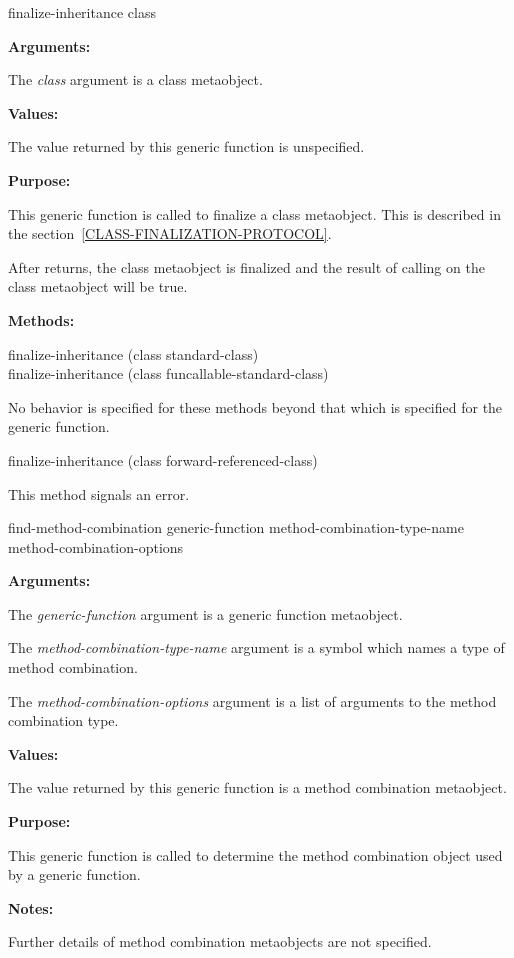 \begin{defun}
finalize-inheritance class

\textbf{Arguments:}

The \emph{class} argument is a class metaobject.

\textbf{Values:}

The value returned by this generic function is unspecified.

\textbf{Purpose:}

This generic function is called to finalize a class metaobject. This is
described in the section~\ref{CLASS-FINALIZATION-PROTOCOL}.

After  returns, the class metaobject is finalized and the
result of calling  on the class metaobject will be true.

\textbf{Methods:}

\begin{defun}
finalize-inheritance (class standard-class) \\
finalize-inheritance (class funcallable-standard-class)

No behavior is specified for these methods beyond that which is specified for the generic function.
\end{defun}

\begin{defun}
finalize-inheritance (class forward-referenced-class)

This method signals an error.
\end{defun}
\end{defun}

\begin{defun}
find-method-combination generic-function method-combination-type-name method-combination-options

\textbf{Arguments:}

The \emph{generic-function} argument is a generic function metaobject.

The \emph{method-combination-type-name} argument is a symbol which names a type
of method combination.

The \emph{method-combination-options} argument is a list of arguments to the
method combination type.

\textbf{Values:}

The value returned by this generic function is a method combination metaobject.

\textbf{Purpose:}

This generic function is called to determine the method combination object used
by a generic function.

\textbf{Notes:}

Further details of method combination metaobjects are not specified.
\end{defun}

